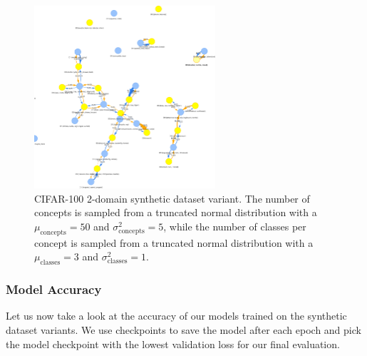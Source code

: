 \begin{figure}[ht]
      \centering
      \includegraphics[width=0.6\textwidth]{figures/cifar100_2domain.png}
      \caption{CIFAR-100 2-domain synthetic dataset variant.
      The number of concepts is sampled from a truncated normal distribution
      with a $\mu_{\text{concepts}}=50$ and $\sigma^2_{\text{concepts}}=5$,
      while the number of classes per concept is sampled from a truncated normal distribution
      with a $\mu_{\text{classes}}=3$ and $\sigma^2_{\text{classes}}=1$.}
      \label{fig:cifar100_2domain}
\end{figure}

\subsubsection{Model Accuracy}

Let us now take a look at the accuracy of our models trained on the synthetic dataset variants.
We use checkpoints to save the model after each epoch and pick the model checkpoint with the lowest validation loss
for our final evaluation.

